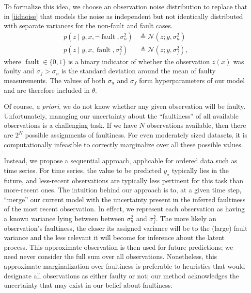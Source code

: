\documentclass{article}
\newcommand{\deq}{\ensuremath{\triangleq}}
\newcommand{\given}{\ensuremath{\mid}}
\newcommand{\cm}[1]{\ensuremath{\mathcal{#1}}}
\newcommand{\st}{_{\star}}
\DeclareMathOperator{\fault}{fault}
\begin{document}
To formalize this idea, we choose an observation noise distribution to
replace that in \eqref{iidnoise} that models the noise as independent
but not identically distributed with separate variances for the
non-fault and fault cases.
\begin{align*}
 p(z \given y, x, \neg\fault, \sigma_n^2)
 &
 \deq
 \cm{N}(z; y, \sigma_n^2)
 \\
 p(z \given y, x, \fault, \sigma_f^2)
 &
 \deq
 \cm{N}(z; y, \sigma_f^2),
\end{align*}
where $\fault \in \lbrace 0, 1 \rbrace$ is a binary indicator of
whether the observation $z(x)$ was faulty and $\sigma_f > \sigma_n$ is
the standard deviation around the mean of faulty measurements.  The
values of both $\sigma_n$ and $\sigma_f$ form hyperparameters of our
model and are therefore included in $\theta$.

Of course, {\it a priori}, we do not know whether any given
observation will be faulty.  Unfortunately, managing our uncertainty
about the ``faultiness'' of all available observations is a
challenging task. If we have $N$ observations available, then there
are $2^N$ possible assignments of faultiness. For even moderately
sized datasets, it is computationally infeasible to correctly
marginalize over all these possible values.

Instead, we propose a sequential approach, applicable for ordered data
such as time series. For time series, the value to be predicted $y\st$
typically lies in the future, and less-recent observations are
typically less pertinent for this task than more-recent ones. The
intuition behind our approach is to, at a given time step, ``merge''
our current model with the uncertainty present in the inferred
faultiness of the most recent observation. In effect, we represent
each observation as having a known variance lying between between
$\sigma_n^2$ and $\sigma_f^2$. The more likely an observation's
faultiness, the closer its assigned variance will be to the (large)
fault variance and the less relevant it will become for inference
about the latent process. This approximate observation is then used
for future predictions; we need never consider the full sum over all
observations. Nonetheless, this approximate marginalization over
faultiness is preferable to heuristics that would designate all
observations as either faulty or not; our method acknowledges the
uncertainty that may exist in our belief about faultiness.
\end{document}
